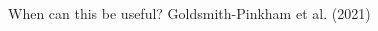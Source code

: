 \documentclass[notes,11pt, aspectratio=169]{beamer}
\begin{document}
\begin{frame}{When can this be useful? Goldsmith-Pinkham et al. (2021)}
\begin{columns}[T]
\begin{column}{0.5\textwidth}
\end{column}
\end{columns}
\end{frame}
\end{document}
